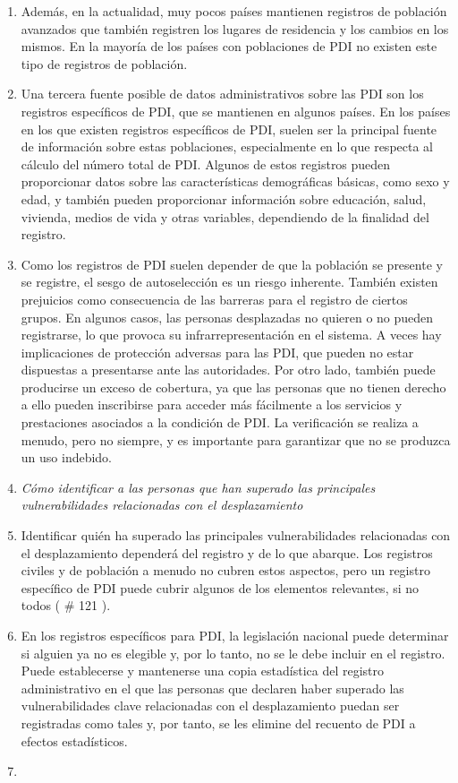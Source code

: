 \documentclass[
]{book}
\begin{document}
\begin{enumerate}
\item
  Además, en la actualidad, muy pocos países mantienen registros de población avanzados que también registren los lugares de residencia y los cambios en los mismos. En la mayoría de los países con poblaciones de PDI no existen este tipo de registros de población.
\item
  Una tercera fuente posible de datos administrativos sobre las PDI son los registros específicos de PDI, que se mantienen en algunos países. En los países en los que existen registros específicos de PDI, suelen ser la principal fuente de información sobre estas poblaciones, especialmente en lo que respecta al cálculo del número total de PDI. Algunos de estos registros pueden proporcionar datos sobre las características demográficas básicas, como sexo y edad, y también pueden proporcionar información sobre educación, salud, vivienda, medios de vida y otras variables, dependiendo de la finalidad del registro.
\item
  Como los registros de PDI suelen depender de que la población se presente y se registre, el sesgo de autoselección es un riesgo inherente. También existen prejuicios como consecuencia de las barreras para el registro de ciertos grupos. En algunos casos, las personas desplazadas no quieren o no pueden registrarse, lo que provoca su infrarrepresentación en el sistema. A veces hay implicaciones de protección adversas para las PDI, que pueden no estar dispuestas a presentarse ante las autoridades. Por otro lado, también puede producirse un exceso de cobertura, ya que las personas que no tienen derecho a ello pueden inscribirse para acceder más fácilmente a los servicios y prestaciones asociados a la condición de PDI. La verificación se realiza a menudo, pero no siempre, y es importante para garantizar que no se produzca un uso indebido.
\item
  \emph{Cómo identificar a las personas que han superado las principales vulnerabilidades relacionadas con el desplazamiento}
\item
  Identificar quién ha superado las principales vulnerabilidades relacionadas con el desplazamiento dependerá del registro y de lo que abarque. Los registros civiles y de población a menudo no cubren estos aspectos, pero un registro específico de PDI puede cubrir algunos de los elementos relevantes, si no todos (
  \# 121
  ).
\item
  En los registros específicos para PDI, la legislación nacional puede determinar si alguien ya no es elegible y, por lo tanto, no se le debe incluir en el registro. Puede establecerse y mantenerse una copia estadística del registro administrativo en el que las personas que declaren haber superado las vulnerabilidades clave relacionadas con el desplazamiento puedan ser registradas como tales y, por tanto, se les elimine del recuento de PDI a efectos estadísticos.
\item ~
  \hypertarget{recomendaciuxf3n-sobre-el-uso-de-datos-administrativos-para-medir-el-nuxfamero-de-pdi-en-el-futuro}{%
}
\end{enumerate}
\end{document}
